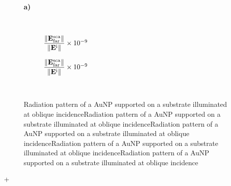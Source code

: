 

\begin{figure}[b!]
    \hspace*{-21em}%
    \vspace*{-1.25em}%
        \begin{subfigure}{.715\textwidth}\caption{ }\label{sfig:IncNormal:1}\end{subfigure}%
        \begin{subfigure}{.25\textwidth}\caption{ }\label{sfig:IncNormal:2}\end{subfigure} \\
    \def\svgwidth{.95\textwidth}
    \small
    \centering
    \vspace*{0em}
    \caption[Absorption and Scattering Efficiencies of a 12.5 nm AuNP above and below a planar Interface Illuminated at Normal Incidence]{\textbf{a)}
    }
\label{fig:IncNormal}
\end{figure}




\begin{figure}[h!]
    \centering
    \def\svgwidth{.8\textwidth}
    \\
        \vspace*{-16.5em}%
        \hspace*{-.2\textwidth}%
    \begin{subfigure}{.4\textwidth}\caption{\footnotesize$\dfrac{\norm{\vb{E}^\text{sca}_\text{far}}}{\norm{\vb{E}^\text{i}}} \times 10^{-9}$  }\label{sfig:Far:IncNorm:a}\end{subfigure}%
    \begin{subfigure}{.4\textwidth}\caption{\footnotesize$\dfrac{\norm{\vb{E}^\text{sca}_\text{far}}}{\norm{\vb{E}^\text{i}}} \times 10^{-9}$  }\label{sfig:Far:IncNorm:b}\end{subfigure}\\[14em]
    \caption[  Radiation pattern of a AuNP supported on a substrate illuminated at oblique incidence ]{Radiation pattern of a AuNP supported on a substrate illuminated at oblique incidenceRadiation pattern of a AuNP supported on a substrate illuminated at oblique incidenceRadiation pattern of a AuNP supported on a substrate illuminated at oblique incidenceRadiation pattern of a AuNP supported on a substrate illuminated at oblique incidenceRadiation pattern of a AuNP supported on a substrate illuminated at oblique incidence    }
    \label{fig:Far:IncNorm}
\end{figure}
+



